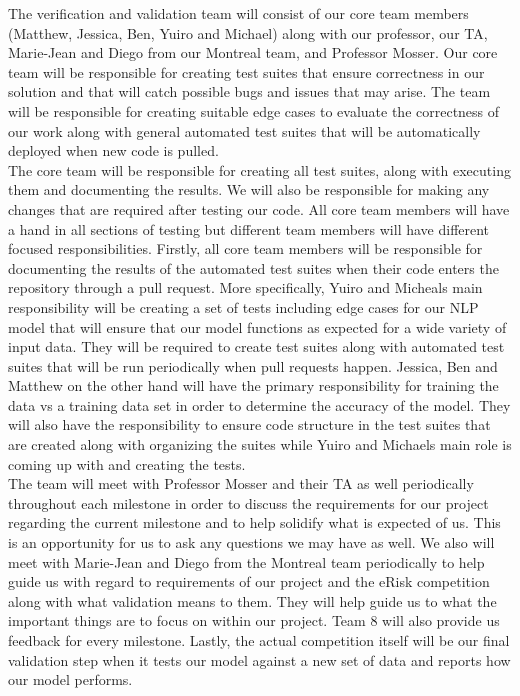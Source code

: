 \documentclass[12pt, titlepage]{article}
\begin{document}
  
  The verification and validation team will consist of our core team members (Matthew, Jessica, Ben, Yuiro and Michael) along with our professor, our TA, Marie-Jean and Diego from our Montreal team, and Professor Mosser.  Our core team will be responsible for creating test suites that ensure correctness in our solution and that will catch possible bugs and issues that may arise. The team will be responsible for creating suitable edge cases to evaluate the correctness of our work along with general automated test suites that will be automatically deployed when new code is pulled.\\
  
  The core team will be responsible for creating all test suites, along with executing them and documenting the results. We will also be responsible for making any changes that are required after testing our code. All core team members will have a hand in all sections of testing but different team members will have different focused responsibilities. Firstly, all core team members will be responsible for documenting the results of the automated test suites when their code enters the repository through a pull request. More specifically, Yuiro and Micheals main responsibility will be creating a set of tests including edge cases for our NLP model that will ensure that our model functions as expected for a wide variety of input data. They will be required to create test suites along with automated test suites that will be run periodically when pull requests happen. Jessica, Ben and Matthew on the other hand will have the primary responsibility for training the data vs a training data set in order to determine the accuracy of the model. They will also have the responsibility to ensure code structure in the test suites that are created along with organizing the suites while Yuiro and Michaels main role is coming up with and creating the tests.\\ 
  
  The team will meet with Professor Mosser and their TA as well periodically throughout each milestone in order to discuss the requirements for our project regarding the current milestone and to help solidify what is expected of us. This is an opportunity for us to ask any questions we may have as well. We also will meet with Marie-Jean and Diego from the Montreal team periodically to help guide us with regard to requirements of our project and the eRisk competition along with what validation means to them. They will help guide us to what the important things are to focus on within our project. Team 8 will also provide us feedback for every milestone. Lastly, the actual competition itself will be our final validation step when it tests our model against a new set of data and reports how our model performs.\\
\end{document}
